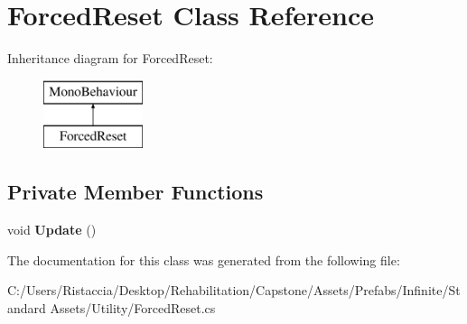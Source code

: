 \hypertarget{class_forced_reset}{}\section{Forced\+Reset Class Reference}
\label{class_forced_reset}
Inheritance diagram for Forced\+Reset\+:\begin{figure}[H]
\begin{center}
\leavevmode
\includegraphics[height=2.000000cm]{class_forced_reset}
\end{center}
\end{figure}
\subsection*{Private Member Functions}
\begin{DoxyCompactItemize}
\item 
\mbox{\label{class_forced_reset_ac566f2f2fe8f40c9c7277cb1bb989084}} 
void {\bfseries Update} ()
\end{DoxyCompactItemize}


The documentation for this class was generated from the following file\+:\begin{DoxyCompactItemize}
\item 
C\+:/\+Users/\+Ristaccia/\+Desktop/\+Rehabilitation/\+Capstone/\+Assets/\+Prefabs/\+Infinite/\+Standard Assets/\+Utility/Forced\+Reset.\+cs\end{DoxyCompactItemize}
